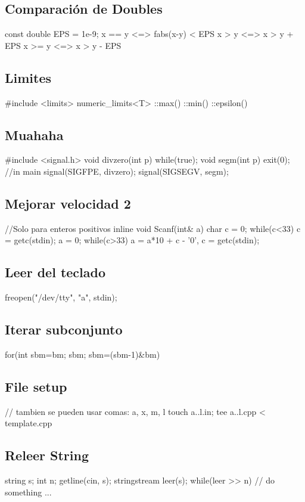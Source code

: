 \subsection*{Comparación de Doubles}
\begin{code}
const double EPS = 1e-9;
x == y	<=> fabs(x-y) < EPS
x >  y	<=> x > y + EPS
x >= y	<=> x > y - EPS
\end{code}
\subsection*{Limites}
\begin{code}
#include <limits>
numeric_limits<T>
	::max()
	::min()
	::epsilon()
\end{code}
\subsection*{Muahaha}
\begin{code}
#include <signal.h>
void divzero(int p){
	while(true);}
void segm(int p){
	exit(0);}
//in main
signal(SIGFPE, divzero);
signal(SIGSEGV, segm);
\end{code}
\subsection*{Mejorar velocidad 2}
\begin{code}
//Solo para enteros positivos
inline void Scanf(int& a){
	char c = 0;
	while(c<33) c = getc(stdin);
	a = 0;
	while(c>33)	a = a*10 + c - '0', c = getc(stdin);
}
\end{code}
\subsection*{Leer del teclado}
\begin{code}
freopen("/dev/tty", "a", stdin);
\end{code}
\subsection*{Iterar subconjunto}
\begin{code}
for(int sbm=bm; sbm; sbm=(sbm-1)&bm)
\end{code}
\subsection*{File setup}
\begin{code}
// tambien se pueden usar comas: {a, x, m, l}
touch {a..l}.in; tee {a..l}.cpp < template.cpp
\end{code}
\subsection*{Releer String}
\begin{code}
string s; int n;
getline(cin, s);
stringstream leer(s);
while(leer >> n){
	// do something ...
}
\end{code}

